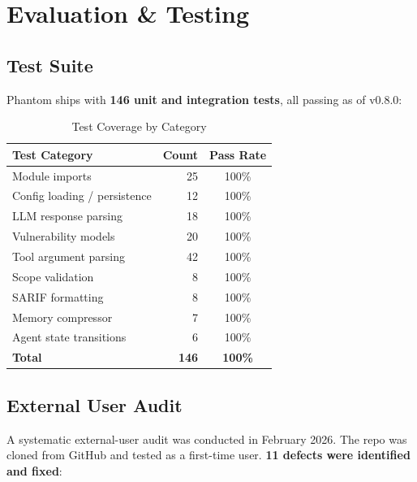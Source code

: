 \documentclass[12pt,a4paper]{article}
\begin{document}
\section{Evaluation \& Testing}

\subsection{Test Suite}

Phantom ships with \textbf{146 unit and integration tests}, all passing as of v0.8.0:

\begin{table}[H]
\centering
\caption{Test Coverage by Category}
\begin{tabular}{lrc}
\toprule
\textbf{Test Category} & \textbf{Count} & \textbf{Pass Rate} \\
\midrule
Module imports & 25 & 100\% \\
Config loading / persistence & 12 & 100\% \\
LLM response parsing & 18 & 100\% \\
Vulnerability models & 20 & 100\% \\
Tool argument parsing & 42 & 100\% \\
Scope validation & 8 & 100\% \\
SARIF formatting & 8 & 100\% \\
Memory compressor & 7 & 100\% \\
Agent state transitions & 6 & 100\% \\
\midrule
\textbf{Total} & \textbf{146} & \textbf{100\%} \\
\bottomrule
\end{tabular}
\end{table}

\subsection{External User Audit}

A systematic external-user audit was conducted in February 2026. The repo was cloned from GitHub and tested as a first-time user. \textbf{11 defects were identified and fixed}:
\end{document}
